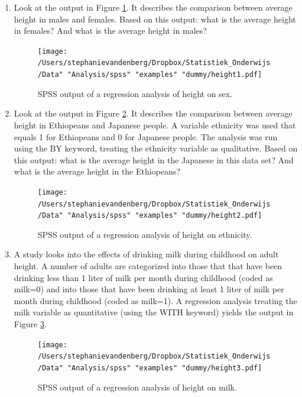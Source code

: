 \documentclass[]{report}\usepackage[]{graphicx}\usepackage[]{color}
\begin{document}
\begin{enumerate}

\item Look at the output in Figure \ref{fig:dummy_12}. It describes the comparison between average height in males and females. Based on this output: what is the average height in females? And what is the average height in males?

\begin{figure}[h]
    \begin{center}
       \texttt{[image: /Users/stephanievandenberg/Dropbox/Statistiek\_Onderwijs/Data" "Analysis/spss" "examples" "dummy/height1.pdf]}
    \end{center}
 \caption{SPSS output of a regression analysis of height on sex.}
 \label{fig:dummy_12}
\end{figure}

\item Look at the output in Figure \ref{fig:dummy_13}. It describes the comparison between average height in Ethiopeans and Japanese people. A variable ethnicity was used that equals 1 for Ethiopeans and 0 for Japanese people. The analysis was run using the BY keyword, treating the ethnicity variable as qualitative. Based on this output: what is the average height in the Japanese in this data set? And what is the average height in the Ethiopeans?

\begin{figure}[h]
    \begin{center}
       \texttt{[image: /Users/stephanievandenberg/Dropbox/Statistiek\_Onderwijs/Data" "Analysis/spss" "examples" "dummy/height2.pdf]}
    \end{center}
 \caption{SPSS output of a regression analysis of height on ethnicity.}
 \label{fig:dummy_13}
\end{figure}

\item A study looks into the effects of drinking milk during childhood on adult height. A number of adults are categorized into those that that have been drinking less than 1 liter of milk per month during childhood (coded as milk=0) and into those that have been drinking at least 1 liter of milk per month during childhood (coded as milk=1). A regression analysis treating the milk variable as quantitative (using the WITH keyword) yields the output in Figure \ref{fig:dummy_14}.

\begin{figure}[h]
    \begin{center}
       \texttt{[image: /Users/stephanievandenberg/Dropbox/Statistiek\_Onderwijs/Data" "Analysis/spss" "examples" "dummy/height3.pdf]}
    \end{center}
 \caption{SPSS output of a regression analysis of height on milk.}
 \label{fig:dummy_14}
\end{figure}


\end{enumerate}
\end{document}
